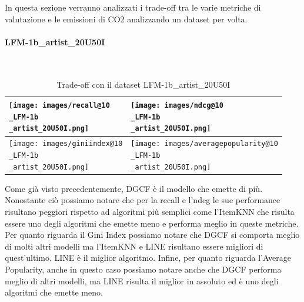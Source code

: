 In questa sezione verranno analizzati i trade-off tra le varie metriche di valutazione e le emissioni di CO2 analizzando un dataset per volta.

\paragraph{LFM-1b\_artist\_20U50I} \textcolor{white}{.} \\
\begin{table}[H]
    \centering
    \footnotesize
    \setlength\tabcolsep{0pt}
    \begin{tabularx}{\textwidth}{|X|X|}
        \hline
        \texttt{[image: images/recall@10\\\_LFM-1b\\\_artist\_20U50I.png]} &
        \texttt{[image: images/ndcg@10\\\_LFM-1b\\\_artist\_20U50I.png]} \\
        \hline
        \texttt{[image: images/giniindex@10\\\_LFM-1b\\\_artist\_20U50I.png]} &
        \texttt{[image: images/averagepopularity@10\\\_LFM-1b\\\_artist\_20U50I.png]} \\
        \hline
    \end{tabularx}
    \caption{Trade-off con il dataset LFM-1b\_artist\_20U50I}
    \label{tab:emissions_info}
\end{table}

\noindent Come già visto precedentemente, DGCF è il modello che emette di più. Nonostante ciò possiamo notare che per la recall e l'ndcg le sue performance risultano peggiori rispetto ad algoritmi più semplici come l'ItemKNN che risulta essere uno degli algoritmi che emette meno e performa meglio in queste metriche.
Per quanto riguarda il Gini Index possiamo notare che DGCF si comporta meglio di molti altri modelli ma l'ItemKNN e LINE risultano essere migliori di quest'ultimo. LINE è il miglior algoritmo.
Infine, per quanto riguarda l'Average Popularity, anche in questo caso possiamo notare anche che DGCF performa meglio di altri modelli, ma LINE risulta il miglior in assoluto ed è uno degli algoritmi che emette meno.


